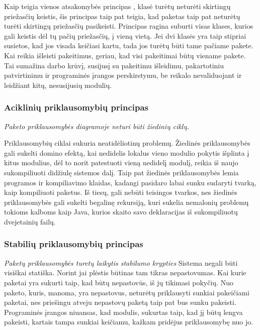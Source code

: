Kaip teigia vienos atsakomybės principas , klasė turėtų neturėti skirtingų priežasčių keistis,
šis principas taip pat teigia, kad paketas taip pat neturėtų turėti skirtingų priežasčių pasikeisti.
Principas ragina suburti visas klases, kurios gali keistis dėl tų pačių priežasčių, į vieną vietą.
Jei dvi klasės yra taip stipriai susietos, kad jos visada keičiasi kartu, tada
jos turėtų būti tame pačiame pakete.
Kai reikia išleisti pakeitimus, geriau, kad visi pakeitimai būtų viename pakete.
Tai sumažina darbo krūvį, susijusį su pakeitimu išleidimu, pakartotiniu patvirtinimu ir programinės įrangos perskirstymu,
be reikalo nevaliduojant ir leidžiant kitų, nesusijusių modulių\cite{AgileSoftwareDevelopment}.

\subsubsection{Aciklinių priklausomybių principas}
\textit{Paketo priklausomybės diagramoje neturi būti žiedinių ciklų.}

Priklausomybių ciklai sukuria neatidėliotinų problemų.
Žiedinės priklausomybės gali sukelti domino efektą, kai nedidelis lokalus vieno modulio pokytis išplinta į kitus modulius,
dėl to norit patestuoti vieną nedidelį modulį, reikia iš naujo sukompiliuoti didžiulę sistemos dalį.
Taip pat žiedinės priklausomybės lemia programos ir kompiliavimo klaidas, kadangi pasidaro labai sunku sudaryti tvarką, kaip kompiliuoti paketus.
Iš tiesų, gali nebūti teisingos tvarkos, nes žiedinės priklausomybės gali sukelti begalinę rekursiją,
kuri sukelia nemalonių problemų tokioms kalboms kaip Java, kurios skaito savo deklaracijas iš
sukompiliuotų dvejetainių failų\cite{AgileSoftwareDevelopment}.


\subsubsection{Stabilių priklausomybių principas}
\textit{Paketų priklausomybės turetų laikytis stabilumo krypties}
Sistema negali būti visiškai statiška.
Norint jai plėstis būtinas tam tikras nepastovumas.
Kai kurie paketai yra sukurti taip, kad būtų nepastovūs, iš jų tikimasi pokyčių.
Nuo paketo, kuris, manoma, yra nepastovus, neturėtų priklausyti sunkiai pakeičiami paketai,
nes priešingu atveju nepastovų paketą taip pat bus sunku pakeisti.
Programinės įrangos niuansas, kad modulis, sukurtas taip, kad jį būtų lengva pakeisti, kartais tampa sunkiai keičiamu, kažkam
 pridėjus priklausomybę nuo jo\cite{AgileSoftwareDevelopment}.


